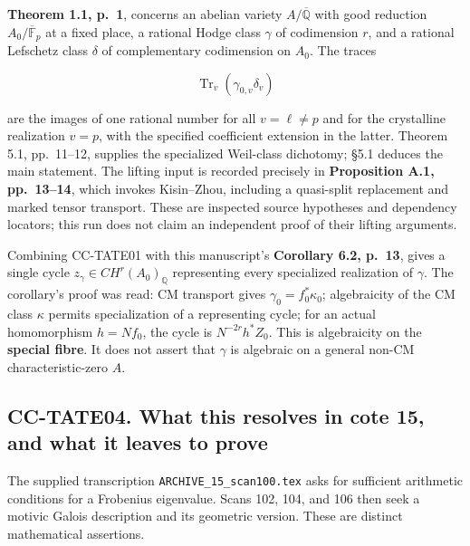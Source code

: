 \documentclass[11pt,a4paper]{article}
\theoremstyle{definition}\newtheorem{definition}[theorem]{Definition}
\theoremstyle{remark}\newtheorem{remark}[theorem]{Remark}
\begin{document}
\textbf{Theorem 1.1, p.~1}, concerns an abelian variety
\(A/\overline{\mathbb Q}\) with good reduction
\(A_0/\overline{\mathbb F}_p\) at a fixed place, a rational Hodge class
\(\gamma\) of codimension \(r\), and a rational Lefschetz class
\(\delta\) of complementary codimension on \(A_0\). The traces

\[
\operatorname{Tr}_v(\gamma_{0,v}\delta_v)
\]

are the images of one rational number for all \(v=\ell\ne p\) and for
the crystalline realization \(v=p\), with the specified coefficient
extension in the latter. Theorem 5.1, pp.~11--12, supplies the
specialized Weil-class dichotomy; §5.1 deduces the main statement. The
lifting input is recorded precisely in \textbf{Proposition A.1,
pp.~13--14}, which invokes Kisin--Zhou, including a quasi-split
replacement and marked tensor transport. These are inspected source
hypotheses and dependency locators; this run does not claim an
independent proof of their lifting arguments.

Combining CC-TATE01 with this manuscript's \textbf{Corollary 6.2,
p.~13}, gives a single cycle \(z_\gamma\in CH^r(A_0)_{\mathbb Q}\)
representing every specialized realization of \(\gamma\). The
corollary's proof was read: CM transport gives
\(\gamma_0=f_0^*\kappa_0\); algebraicity of the CM class \(\kappa\)
permits specialization of a representing cycle; for an actual
homomorphism \(h=Nf_0\), the cycle is \(N^{-2r}h^*Z_0\). This is
algebraicity on the \textbf{special fibre}. It does not assert that
\(\gamma\) is algebraic on a general non-CM characteristic-zero \(A\).

\subsection{CC-TATE04. What this resolves in cote 15, and what it leaves
to
prove}\label{cc-tate04.-what-this-resolves-in-cote-15-and-what-it-leaves-to-prove}

The supplied transcription \nolinkurl{ARCHIVE_15_scan100.tex} asks for
sufficient arithmetic conditions for a Frobenius eigenvalue. Scans 102,
104, and 106 then seek a motivic Galois description and its geometric
version. These are distinct mathematical assertions.
\end{document}
